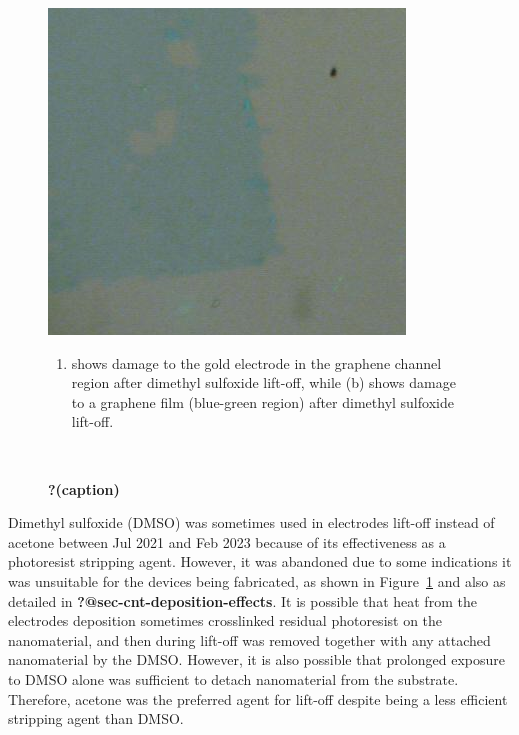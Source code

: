 \documentclass[
  a4paper,
]{scrbook}
\providecommand{\tightlist}{%
  \setlength{\itemsep}{0pt}\setlength{\parskip}{0pt}}\usepackage{longtable,booktabs,array}
\begin{document}
\begin{figure}
\begin{minipage}[t]{0.47\linewidth}
{{\includegraphics{./figures/ch4/may-21-dmso-damage.png}

}

}

\subcaption{\label{fig-graphene-dmso-damage}}
\end{minipage}%
\newline
\begin{minipage}[t]{0.47\linewidth}

{\centering 

\begin{enumerate}
\def\labelenumi{(\alph{enumi})}
\tightlist
\item
  shows damage to the gold electrode in the graphene channel region
  after dimethyl sulfoxide lift-off, while (b) shows damage to a
  graphene film (blue-green region) after dimethyl sulfoxide lift-off.
\end{enumerate}

}

\end{minipage}%
%
\begin{minipage}[t]{0.05\linewidth}

{\centering 

~

}

\end{minipage}%

\caption{\label{fig-dmso-damage}\textbf{?(caption)}}

\end{figure}

Dimethyl sulfoxide (DMSO) was sometimes used in electrodes lift-off
instead of acetone between Jul 2021 and Feb 2023 because of its
effectiveness as a photoresist stripping agent. However, it was
abandoned due to some indications it was unsuitable for the devices
being fabricated, as shown in Figure~\ref{fig-dmso-damage} and also as
detailed in \textbf{?@sec-cnt-deposition-effects}. It is possible that
heat from the electrodes deposition sometimes crosslinked residual
photoresist on the nanomaterial, and then during lift-off was removed
together with any attached nanomaterial by the DMSO. However, it is also
possible that prolonged exposure to DMSO alone was sufficient to detach
nanomaterial from the substrate. Therefore, acetone was the preferred
agent for lift-off despite being a less efficient stripping agent than
DMSO.
\end{document}
